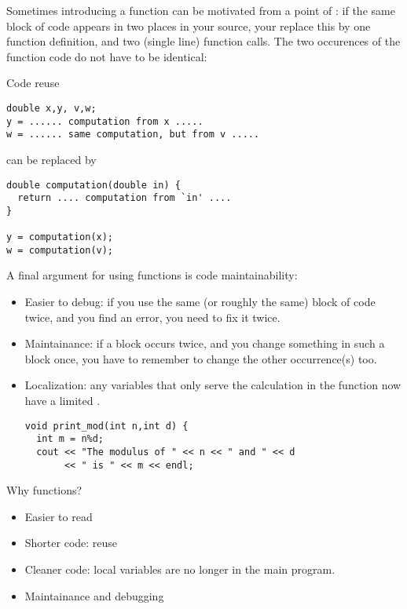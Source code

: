 Sometimes introducing a function can be motivated from a point of
: if the same block of code appears in two
places in your source, your replace this by one function definition,
and two (single line) function calls.
The two occurences of the function code do not have to be identical:


\begin{block}{Code reuse}
  \label{sl:reuse}
\begin{verbatim}
double x,y, v,w;
y = ...... computation from x .....
w = ...... same computation, but from v .....
\end{verbatim}
can be replaced by
\begin{verbatim}
double computation(double in) {
  return .... computation from `in' ....
}

y = computation(x);
w = computation(v);
\end{verbatim}
\end{block}

A final argument for using functions is code maintainability:
\begin{itemize}
\item Easier to debug: if you use the same (or roughly the same) block
  of code twice, and you find an error, you need to fix it twice.
\item Maintainance: if a block occurs twice, and  you change something in such a block
  once, you have to remember to change the other occurrence(s) too.
\item Localization: any variables that only serve the calculation in
  the function now have a limited .
\begin{verbatim}
void print_mod(int n,int d) {
  int m = n%d;
  cout << "The modulus of " << n << " and " << d 
       << " is " << m << endl;
\end{verbatim}
\end{itemize}

\begin{slide}{Why functions?}
  \label{sl:func-why}
  \begin{itemize}
  \item Easier to read
  \item Shorter code: reuse
  \item Cleaner code: local variables are no longer in the main program.
  \item Maintainance and debugging
  \end{itemize}
\end{slide}

